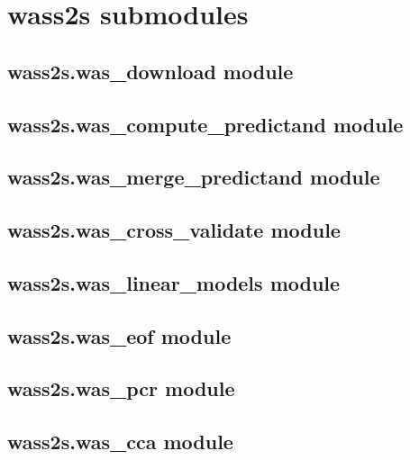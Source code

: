 \documentclass[letterpaper,10pt,english]{sphinxmanual}
\begin{document}
\sphinxstepscope


\chapter{wass2s submodules}
\label{\detokenize{api:wass2s-submodules}}\label{\detokenize{api::doc}}

\section{wass2s.was\_download module}
\label{\detokenize{api:wass2s-was-download-module}}

\section{wass2s.was\_compute\_predictand module}
\label{\detokenize{api:wass2s-was-compute-predictand-module}}

\section{wass2s.was\_merge\_predictand module}
\label{\detokenize{api:wass2s-was-merge-predictand-module}}

\section{wass2s.was\_cross\_validate module}
\label{\detokenize{api:wass2s-was-cross-validate-module}}

\section{wass2s.was\_linear\_models module}
\label{\detokenize{api:wass2s-was-linear-models-module}}

\section{wass2s.was\_eof module}
\label{\detokenize{api:wass2s-was-eof-module}}

\section{wass2s.was\_pcr module}
\label{\detokenize{api:wass2s-was-pcr-module}}

\section{wass2s.was\_cca module}
\label{\detokenize{api:wass2s-was-cca-module}}
\end{document}
